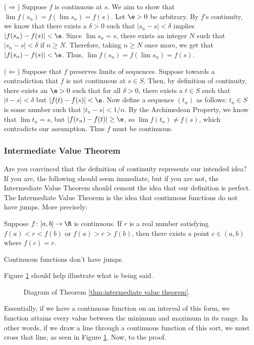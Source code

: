 \documentclass[class=article, crop=false]{standalone}
\begin{document}
\begin{pf}
    ($\Rightarrow$) Suppose $f$ is continuous at $s$. We aim to show that $\lim f(s_n) = f( \lim s_n) = f(s)$. Let $\e > 0$ be arbitrary. By $f$'s continuity, we know that there exists a $\delta > 0$ such that $|s_n - s| < \delta$ implies $|f(s_n)-f(s)| < \e$. Since $\lim s_n = s$, there exists an integer $N$ such that $|s_n-s| <\delta$ if $n \geq N$. Therefore, taking $n \geq N$ once more, we get that $|f(s_n)-f(s)| < \e$. Thus, $\lim f(s_n) = f(\lim s_n) = f(s)$.

    ($\Leftarrow$) Suppose that $f$ preserves limits of sequences. Suppose towards a contradiction that $f$ is not continuous at $s \in S$. Then, by definition of continuity, there exists an $\e > 0$ such that for all $\delta > 0$, there exists a $t \in S$ such that $|t-s| < \delta$ but $|f(t)-f(s)| < \e$. Now define a sequence $(t_n)$ as follows: $t_n \in S$ is some number such that $|t_n-s| < 1/n$. By the Archimedean Property, we know that $\lim t_n = s$, but $|f(r_n) - f(t)| \geq \e$, so $\lim f(t_n) \neq f(s)$, which contradicts our assumption. Thus $f$ must be continuous.
\end{pf}

\subsubsection*{Intermediate Value Theorem}

Are you convinced that the definition of continuity represents our intended idea? If you are, the following should seem immediate, but if you are not, the Intermediate Value Theorem should cement the idea that our definition is perfect. The Intermediate Value Theorem is the idea that continuous functions do not have jumps. More precisely:
\begin{thm}{\label{thm:intermediate value theorem}}
    Suppose $f \colon [a,b] \to \R$ is continuous. If $r$ is a real number satisfying $f(a) < r <f(b)$ or $f(a) > r > f(b)$, then there exists a point $c \in (a,b)$ where $f(c) = r$.
\end{thm}
\begin{slogan}
    Continuous functions don't have jumps.
\end{slogan}
Figure \ref{fig:intermediatevaluetheorem} should help illustrate what is being said.
\begin{figure}[ht]
    \centering
    \caption{Diagram of Theorem \ref{thm:intermediate value theorem}.}
    \label{fig:intermediatevaluetheorem}
\end{figure}
Essentially, if we have a continuous function on an interval of this form, we function attains every value between the minimum and maximum in its range. In other words, if we draw a line through a continuous function of this sort, we must cross that line, as seen in Figure \ref{fig:intermediatevaluetheorem}. Now, to the proof.
\end{document}
